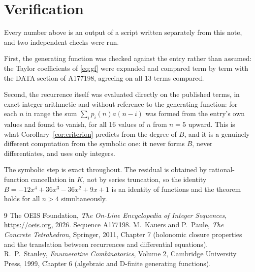 \documentclass[11pt,a4paper]{article}
\theoremstyle{plain}
\theoremstyle{definition}
\begin{document}
\section{Verification}

Every number above is an output of a script written separately from this note, and two
independent checks were run.

First, the generating function was checked against the entry rather than assumed: the
Taylor coefficients of \eqref{eq:gf} were expanded and compared term by term with the DATA
section of A177198, agreeing on all 13 terms compared.

Second, the recurrence itself was evaluated directly on the published terms, in exact
integer arithmetic and without reference to the generating function: for each $n$ in range
the sum $\sum_{i}p_{i}(n)a(n-i)$ was formed from the entry's own values and found to
vanish, for all 16 values of $n$ from $n=5$ upward. This is what
Corollary~\ref{cor:criterion} predicts from the degree of $B$, and it is a genuinely
different computation from the symbolic one: it never forms $B$, never differentiates, and
uses only integers.

The symbolic step is exact throughout. The residual is obtained by rational-function
cancellation in $K$, not by series truncation, so the identity $B=- 12 x^{4} + 36 x^{3} - 36 x^{2} + 9 x + 1$ is an
identity of functions and the theorem holds for all $n>4$ simultaneously.

\begin{thebibliography}{9}
 The OEIS Foundation, \emph{The On-Line Encyclopedia of Integer Sequences},
\url{https://oeis.org}, 2026. Sequence A177198.
 M.~Kauers and P.~Paule, \emph{The Concrete Tetrahedron}, Springer, 2011,
Chapter 7 (holonomic closure properties and the translation between recurrences and
differential equations).
 R.~P.~Stanley, \emph{Enumerative Combinatorics}, Volume 2, Cambridge
University Press, 1999, Chapter 6 (algebraic and D-finite generating functions).
\end{thebibliography}
\end{document}
